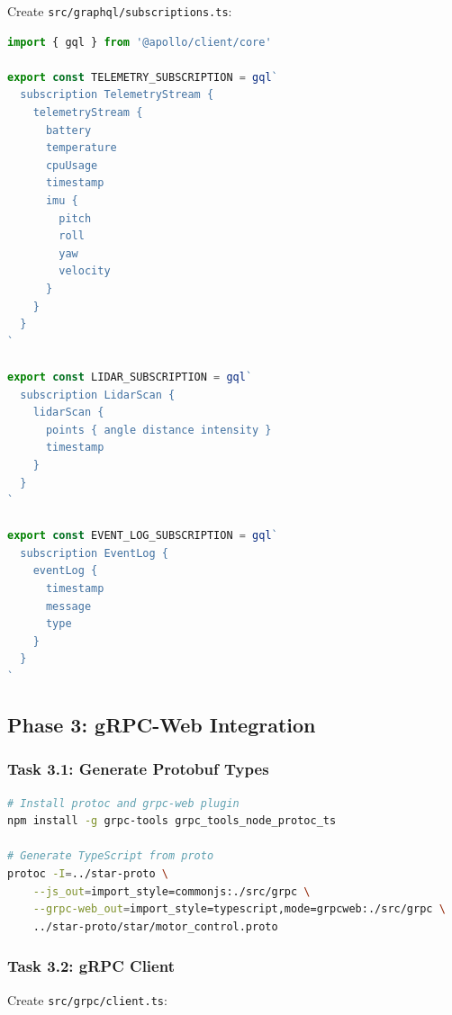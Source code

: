 \documentclass[11pt,letterpaper]{article}
\begin{document}
Create \texttt{src/graphql/subscriptions.ts}:

\begin{lstlisting}[language=TypeScript, caption=subscriptions.ts]
import { gql } from '@apollo/client/core'

export const TELEMETRY_SUBSCRIPTION = gql`
  subscription TelemetryStream {
    telemetryStream {
      battery
      temperature
      cpuUsage
      timestamp
      imu {
        pitch
        roll
        yaw
        velocity
      }
    }
  }
`

export const LIDAR_SUBSCRIPTION = gql`
  subscription LidarScan {
    lidarScan {
      points { angle distance intensity }
      timestamp
    }
  }
`

export const EVENT_LOG_SUBSCRIPTION = gql`
  subscription EventLog {
    eventLog {
      timestamp
      message
      type
    }
  }
`
\end{lstlisting}

\subsection{Phase 3: gRPC-Web Integration}

\subsubsection{Task 3.1: Generate Protobuf Types}

\begin{lstlisting}[language=bash]
# Install protoc and grpc-web plugin
npm install -g grpc-tools grpc_tools_node_protoc_ts

# Generate TypeScript from proto
protoc -I=../star-proto \
    --js_out=import_style=commonjs:./src/grpc \
    --grpc-web_out=import_style=typescript,mode=grpcweb:./src/grpc \
    ../star-proto/star/motor_control.proto
\end{lstlisting}

\subsubsection{Task 3.2: gRPC Client}

Create \texttt{src/grpc/client.ts}:
\end{document}
